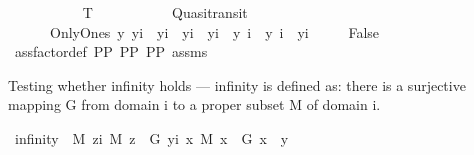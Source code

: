 \begin{isabellebody}
\ \ %
\ \isanewline
\ \ %
\isanewline
\ \ \isamarkupfalse%
%
\endisatagproof
{\isafoldproof}%
%
\isadelimproof
\isanewline
%
\endisadelimproof
\isanewline
{}\isamarkupfalse%
\ T{}{\isacharcolon}{\kern0pt}\isanewline
\ \ \ \ \isanewline
\ \ \ \ \ \ Quasitransit\ \isanewline
\ \ \ \ \ \ OnlyOnes{\isacharcolon}{\kern0pt}\ {\isachardoublequoteopen}{\isasymforall}y{\isachardot}{\kern0pt}\ y{\isacharequal}{\kern0pt}i{}\ {\isasymor}\ y{\isacharequal}{\kern0pt}i{}\ {\isasymor}\ y{\isacharequal}{\kern0pt}i{}\ {\isasymor}\ y{\isacharequal}{\kern0pt}i{}\ {\isasymor}\ y{\isacharequal}{\kern0pt}\ i{}\ {\isasymor}\ y{\isacharequal}{\kern0pt}\ i{}\ {\isasymor}\ y{\isacharequal}{\kern0pt}i{}{\isachardoublequoteclose}\isanewline
\ \ \ \ \ False\isanewline
%
\isadelimproof
\ \ %
\endisadelimproof
%
\isatagproof
{}\isamarkupfalse%
\ assfactor{\isacharunderscore}{\kern0pt}def\ PP{}\ PP{}\ PP{}\ assms\isanewline
\ \ %
\isanewline
\ \ %
\isanewline
\ \ \isamarkupfalse%
%
\endisatagproof
{\isafoldproof}%
%
\isadelimproof
%
\endisadelimproof
%
\begin{isamarkuptext}%
Testing whether infinity holds — infinity is defined as: there is a surjective mapping G from 
   domain i to a proper subset M of domain i.%
\end{isamarkuptext}\isamarkuptrue%
\isamarkupfalse%
\ {\isachardoublequoteopen}infinity\ {\isasymequiv}\ {\isasymexists}M{\isachardot}{\kern0pt}\ {\isacharparenleft}{\kern0pt}{\isasymexists}z{\isacharcolon}{\kern0pt}{\isacharcolon}{\kern0pt}i{\isachardot}{\kern0pt}\ {\isasymnot}{\isacharparenleft}{\kern0pt}M\ z{\isacharparenright}{\kern0pt}\ {\isasymand}\ {\isacharparenleft}{\kern0pt}{\isasymexists}G{\isachardot}{\kern0pt}\ {\isacharparenleft}{\kern0pt}{\isasymforall}y{\isacharcolon}{\kern0pt}{\isacharcolon}{\kern0pt}i{\isachardot}{\kern0pt}\ {\isacharparenleft}{\kern0pt}{\isasymexists}x{\isachardot}{\kern0pt}\ {\isacharparenleft}{\kern0pt}M\ x{\isacharparenright}{\kern0pt}\ {\isasymand}\ {\isacharparenleft}{\kern0pt}G\ x{\isacharparenright}{\kern0pt}\ {\isacharequal}{\kern0pt}\ y{\isacharparenright}{\kern0pt}{\isacharparenright}{\kern0pt}{\isacharparenright}{\kern0pt}{\isacharparenright}{\kern0pt}{\isachardoublequoteclose}\isanewline

\end{isabellebody}

